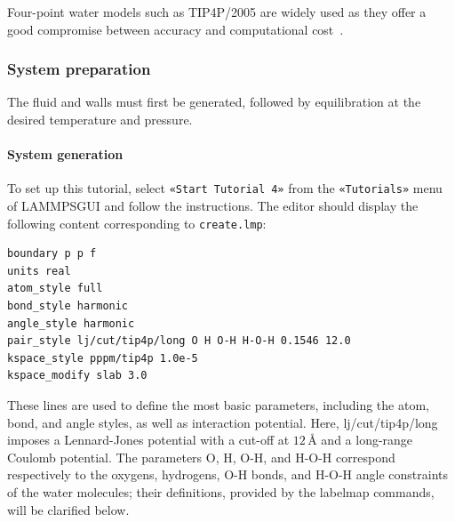 \documentclass[9pt,tutorial]{livecoms}
\newcommand{\lmpcmd}[1]{\hspace{0pt}\colorbox{listing}{\textcolor{command}{\small{#1}}}\hspace{0pt}} %
\newcommand{\flecmd}[1]{\textcolor{command}{\texttt{#1}}} %
\newcommand{\guicmd}[1]{\textcolor{command}{\texttt{«#1»}}} %
\newcommand{\lammpsgui}{\textsf{LAMMPS\textendash GUI}}
\begin{document}
\begin{note}
Four-point water models such as TIP4P/2005 are widely used as they offer a
good compromise between accuracy and computational cost~\cite{kadaoluwa2021systematic}.
\end{note}

\subsubsection{System preparation}

The fluid and walls must first be generated, followed by equilibration at the
desired temperature and pressure.

\paragraph{System generation}

To set up this tutorial, select \guicmd{Start Tutorial 4} from the
\guicmd{Tutorials} menu of \lammpsgui{} and follow the instructions.
The editor should display the following content corresponding to \flecmd{create.lmp}:
\begin{lstlisting}
boundary p p f
units real
atom_style full
bond_style harmonic
angle_style harmonic
pair_style lj/cut/tip4p/long O H O-H H-O-H 0.1546 12.0
kspace_style pppm/tip4p 1.0e-5
kspace_modify slab 3.0
\end{lstlisting}
These lines are used to define the most basic parameters, including the
atom, bond, and angle styles, as well as interaction
potential.  Here, \lmpcmd{lj/cut/tip4p/long} imposes a Lennard-Jones potential with
a cut-off at $12\,\text{\AA{}}$ and a long-range Coulomb potential.  {\color{blue}
The parameters \lmpcmd{O}, \lmpcmd{H}, \lmpcmd{O-H}, and \lmpcmd{H-O-H} correspond
respectively to the oxygens, hydrogens, O-H bonds, and H-O-H angle constraints of
the water molecules; their definitions, provided by the \lmpcmd{labelmap} commands,
will be clarified below.}
\end{document}
